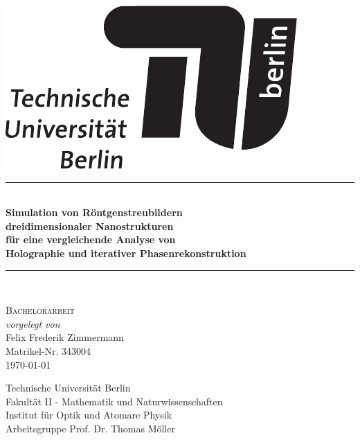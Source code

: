 \begin{titlepage}
	
	\begin{center}
		
		
		\begin{flushright}
			\includegraphics[width=.3\textwidth]{images/TU_Logo.pdf}\\[2.5cm]    
		\end{flushright}
		
		
		{\newcommand{\HRule}{\rule{\linewidth}{0.5mm}}
			\HRule \\[0.4cm]
			\LARGE{\bfseries Simulation von Röntgenstreubildern\\ dreidimensionaler Nanostrukturen\\ für eine vergleichende Analyse von\\ Holographie und iterativer Phasenrekonstruktion}\\
			
			\HRule \\[1.5cm]}
		\textsc{\Large Bachelorarbeit}\\[0.5cm]
		
		\emph{vorgelegt von}\\
		Felix Frederik Zimmermann\\
		Matrikel-Nr. 343004\\[0.5cm]
		{\large \today}
		
		
		\vfill
		
		Technische Universität Berlin\\
		Fakultät II - Mathematik und Naturwissenschaften\\
		Institut für Optik und Atomare Physik\\
		Arbeitsgruppe Prof. Dr. Thomas Möller\\
		
	\end{center}
	
\end{titlepage}